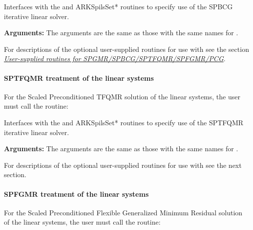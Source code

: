 \documentclass[letterpaper,10pt,english]{sphinxmanual}
\begin{document}
\begin{fulllineitems}
\label{f_interface/Usage:f/_/FARKSPBCG}
Interfaces with the {\hyperref[c_interface/User_callable:ARKSpbcg]{}} and
ARKSpilsSet* routines to specify use of the SPBCG iterative
linear solver.

\textbf{Arguments:}  The arguments are the same as those with the
same names for {\hyperref[f_interface/Usage:f/_/FARKSPGMR]{}}.

\end{fulllineitems}


For descriptions of the optional user-supplied routines for use with
{\hyperref[f_interface/Usage:f/_/FARKSPBCG]{}} see the section {\hyperref[f_interface/Usage:finterface-spilsusersupplied]{\emph{User-supplied routines for SPGMR/SPBCG/SPTFQMR/SPFGMR/PCG}}}.


\paragraph{SPTFQMR treatment of the linear systems}
\label{f_interface/Usage:sptfqmr-treatment-of-the-linear-systems}
For the Scaled Preconditioned TFQMR solution of the linear systems,
the user must call the {\hyperref[f_interface/Usage:f/_/FARKSPTFQMR]{}} routine:

\begin{fulllineitems}
\label{f_interface/Usage:f/_/FARKSPTFQMR}
Interfaces with the {\hyperref[c_interface/User_callable:ARKSptfqmr]{}} and
ARKSpilsSet* routines to specify use of the SPTFQMR iterative
linear solver.

\textbf{Arguments:}  The arguments are the same as those with the same names
for {\hyperref[f_interface/Usage:f/_/FARKSPGMR]{}}.

\end{fulllineitems}


For descriptions of the optional user-supplied routines for use with
{\hyperref[f_interface/Usage:f/_/FARKSPTFQMR]{}} see the next section.


\paragraph{SPFGMR treatment of the linear systems}
\label{f_interface/Usage:spfgmr-treatment-of-the-linear-systems}
For the Scaled Preconditioned Flexible Generalized Minimum Residual
solution of the linear systems, the user must call the
{\hyperref[f_interface/Usage:f/_/FARKSPFGMR]{}} routine:
\end{document}
